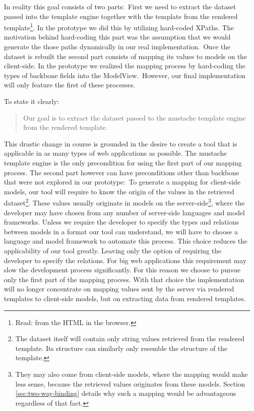 \documentclass[thesis.tex]{subfiles}
\begin{document}
In reality this goal consists of two parts:\
First we need to extract the dataset passed into the template engine together
with the template from the rendered template\footnote{Read: from the HTML in the
browser.}.
In the prototype we did this by utilizing hard-coded XPaths. The motivation
behind hard-coding this part was the assumption that we would generate the those
paths dynamically in our real implementation.\
Once the dataset is rebuilt the second part consists of mapping its values
to models on the client-side. In the prototype we realized the mapping process
by hard-coding the types of backbone fields into the ModelView.\
However, our final implementation will only feature the first of these
processes.

To state it clearly:
\begin{quote}
Our goal is to extract the dataset passed to the mustache template engine from
the rendered template.
\end{quote}

This drastic change in course is grounded in the desire to create a tool that
is applicable in as many types of web applications as possible.
The mustache template engine is the only precondition for using the first part
of our mapping process. The second part however can have preconditions
other than backbone that were not explored in our prototype:\
To generate a mapping for client-side models, our tool will require to know the
origin of the values in the retrieved dataset\footnote{The dataset itself will
	contain only string values retrieved from the rendered template.
	Its structure can similarly only resemble the structure of the template.}.
These values usually originate in models on the server-side\footnote{They
	may also come from client-side models, where the mapping would make less
	sense, because the retrieved values originates from these models.
	Section \ref{sec:two-way-binding} details why such a mapping would be
	advantageous regardless of that fact.}, where the developer may have chosen
from any number of server-side languages
and model frameworks. Unless we require the developer to specify the types and
relations between models in a format our tool can understand, we will have to
choose a language and model framework to automate this process. This choice
reduces the applicability of our tool greatly. Leaving only the option of
requiring the developer to specify the relations. For big web applications this
requirement may slow the development process significantly.
For this reason we choose to pursue only the first part of the mapping process.
With that choice the implementation will no longer concentrate on mapping values
sent by the server via rendered templates to client-side models,
but on extracting data from rendered templates.
\end{document}

